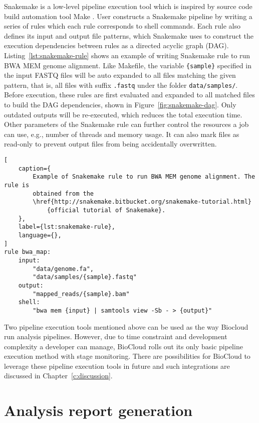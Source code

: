 Snakemake \cite{koster2012:snakemakea} is a low-level pipeline execution tool
which is inspired by source code build automation tool Make \cite{:gnu-make}.
User constructs a Snakemake pipeline by writing a series of rules which each
rule corresponds to shell commands. Each rule also defines its input and output
file patterns, which Snakemake uses to construct the execution dependencies
between rules as a directed acyclic graph (DAG).
Listing~\ref{lst:snakemake-rule} shows an example of writing Snakemake rule to
run BWA MEM genome alignment. Like Makefile, the variable \texttt{\{sample\}}
specified in the input FASTQ files will be auto expanded to all files matching
the given pattern, that is, all files with suffix \texttt{.fastq} under the
folder \texttt{data/samples/}. Before execution, these rules are first
evaluated and expanded to all matched files to build the DAG dependencies,
shown in Figure~\ref{fig:snakemake-dag}. Only outdated outputs will be
re-executed, which reduces the total execution time. Other parameters of the
Snakemake rule can further control the resources a job can use, e.g., number of
threads and memory usage. It can also mark files as read-only to prevent output
files from being accidentally overwritten.

\begin{lstlisting}[
    caption={
        Example of Snakemake rule to run BWA MEM genome alignment. The rule is
        obtained from the
        \href{http://snakemake.bitbucket.org/snakemake-tutorial.html}
            {official tutorial of Snakemake}.
    },
    label={lst:snakemake-rule},
    language={},
]
rule bwa_map:
    input:
        "data/genome.fa",
        "data/samples/{sample}.fastq"
    output:
        "mapped_reads/{sample}.bam"
    shell:
        "bwa mem {input} | samtools view -Sb - > {output}"
\end{lstlisting}



Two pipeline execution tools mentioned above can be used as the way Biocloud
run analysis pipelines. However, due to time constraint and development
complexity a developer can manage, BioCloud rolls out its only basic pipeline
execution method with stage monitoring. There are possibilities for BioCloud to
leverage these pipeline execution tools in future and such integrations are
discussed in Chapter~\ref{c:discussion}.



\section{Analysis report generation}
\label{analysis-report-generation}

